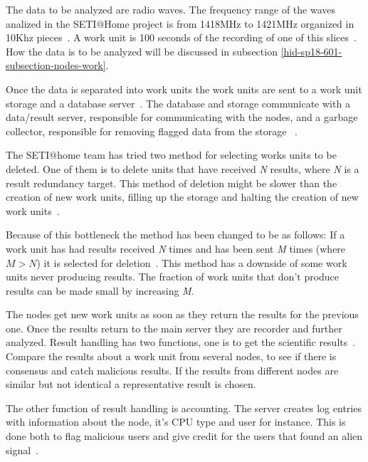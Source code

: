 The data to be analyzed are radio waves. The frequency range of the waves 
analized in the SETI$@$Home project is from 1418MHz to 1421MHz organized in 
10Khz pieces~\cite{hid-sp18-601-paper-anderson2002seti}. A work unit is 100 
seconds of the recording of one of this 
slices~\cite{hid-sp18-601-www-sathome-howworks}. How the data is to be analyzed 
will be discussed in subsection \ref{hid-sp18-601-subsection-nodes-work}.

Once the data is separated into work units the work units are sent to a work 
unit storage and a database server~\cite{hid-sp18-601-book-foster1999carl}. 
The database and storage communicate with a data/result server, responsible for 
communicating with the nodes, and a garbage collector, responsible for 
removing flagged data from the 
storage
~\cite{hid-sp18-601-book-foster1999carl,hid-sp18-601-paper-anderson2002seti}.

The SETI$@$home team has tried two method for selecting works units to be 
deleted. One of them is to delete units that have received \textit{N} results,
where \textit{N} is a result redundancy target. This method of deletion might 
be slower than the creation of new work units, filling up the storage and 
halting the creation of new work 
units~\cite{hid-sp18-601-paper-anderson2002seti}.

Because of this bottleneck the method has been changed to be as follows: 
If a work unit has had results received \textit{N} times and has been sent 
\textit{M} times (where $M>N$) it is selected for 
deletion~\cite{hid-sp18-601-paper-anderson2002seti}. This method has 
a downside of some work units never producing results. The fraction of work
units that don't produce results can be made small by increasing \textit{M}.

The nodes get new work units as soon as they return the results for the 
previous one. Once the results return to the main server they are recorder 
and further analyzed. Result handling has two functions, one is to 
get the scientific results~\cite{hid-sp18-601-paper-anderson2002seti}. 
Compare the results about a work unit from several nodes, to see if there 
is consensus and catch malicious results. 
If the results from different nodes are similar but not identical a 
representative result is chosen.

The other function of result handling is accounting. The server creates 
log entries with information about the node, it's CPU type and user for 
instance. This is done both to flag malicious users and give credit for
the users that found an alien signal~\cite{hid-sp18-601-paper-anderson2002seti}.

